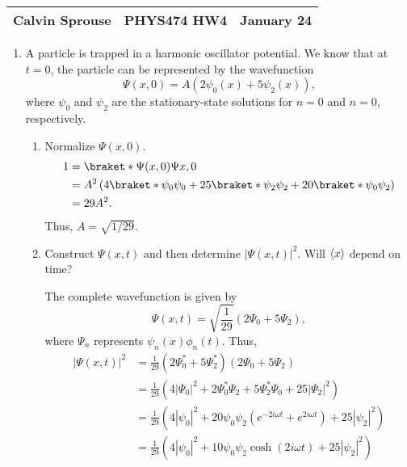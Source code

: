 \documentclass[a4paper, 12pt]{config/homework}
\begin{document}
\noindent
\begin{tabularx}{\textwidth}{>{\centering\arraybackslash}X>{\centering\arraybackslash}X>{\centering\arraybackslash}X}
Calvin Sprouse & PHYS474 HW4 & 2024 January 24\\
\midrule
\end{tabularx}

\begin{enumerate}
\item A particle is trapped in a harmonic oscillator potential. We know that at \(t=0\), the particle can be represented by the wavefunction
\[\Psi(x,0) = A\left(2\psi_0(x) + 5\psi_2(x)\right),\]
where \(\psi_0\) and \(\psi_2\) are the stationary-state solutions for \(n=0\) and \(n=0\), respectively.
\begin{enumerate}[label=(\alph*)]
\item Normalize \(\Psi(x,0)\).
\begin{align*}
1 &= \braket*{\Psi(x,0)}{\Psi{x,0}}
\\&= A^2 \left( 4 \braket*{\psi_0}{\psi_0} + 25 \braket*{\psi_2}{\psi_2} + 20\braket*{\psi_0}{\psi_2} \right)
\\&= 29 A^2.
\end{align*}
Thus, \(A=\sqrt{1/29}\).

\item Construct \(\Psi(x,t)\) and then determine \(\left|\Psi(x,t)\right|^2\). Will \(\left\langle x \right\rangle\) depend on time?

The complete wavefunction is given by
\[\Psi(x,t) = \sqrt{\frac{1}{29}} \left( 2 \Psi_0 + 5 \Psi_2 \right),\]
where \(\Psi_n\) represents \(\psi_n(x)\phi_n(t)\). Thus,
\begin{align*}
\left| \Psi(x,t) \right|^2 &= \frac{1}{29}\left(2\Psi_0^* + 5\Psi_2^*\right)\left(2\Psi_0 + 5\Psi_2\right)
\\&= \frac{1}{29}\left(4\left|\Psi_0\right|^2 + 2\Psi_0^*\Psi_2 + 5\Psi_2^*\Psi_0 + 25\left|\Psi_2\right|^2\right)
\\&= \frac{1}{29}\left(4\left|\psi_0\right|^2
+ 20\psi_0\psi_2\left(e^{-2i\omega t} + e^{2i\omega t}\right)
+ 25\left|\psi_2\right|^2\right)
\\&= \frac{1}{29}\left(
4\left|\psi_0\right|^2
+ 10 \psi_0 \psi_2 \cosh(2i\omega t)
+ 25 \left|\psi_2\right|^2
\right)
\end{align*}

\end{enumerate}


\end{enumerate}
\end{document}
